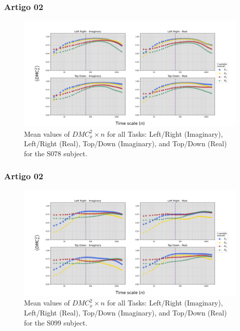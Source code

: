 \documentclass[11pt, aspectratio=169]{beamer}
\begin{document}
\begin{frame}
  \frametitle{Artigo 02}

  \begin{figure}[!h]
    \includegraphics[height=.5\paperheight]{../Figures/art_02/Fig6.jpg}
    \caption{Mean values of $DMC_{x}^{2} \times n$ for all Tasks: Left/Right (Imaginary), Left/Right (Real), Top/Down (Imaginary), and Top/Down (Real) for the S078 subject.}
    \label{fig06}
  \end{figure}
\end{frame}

\begin{frame}
  \frametitle{Artigo 02}

  \begin{figure}[!h]
    \includegraphics[height=.5\paperheight]{../Figures/art_02/Fig7.jpg}
    \caption{Mean values of $DMC_{x}^{2} \times n$ for all Tasks: Left/Right (Imaginary), Left/Right (Real), Top/Down (Imaginary), and Top/Down (Real) for the S099 subject.}
    \label{fig07}
  \end{figure}
\end{frame}
\end{document}
